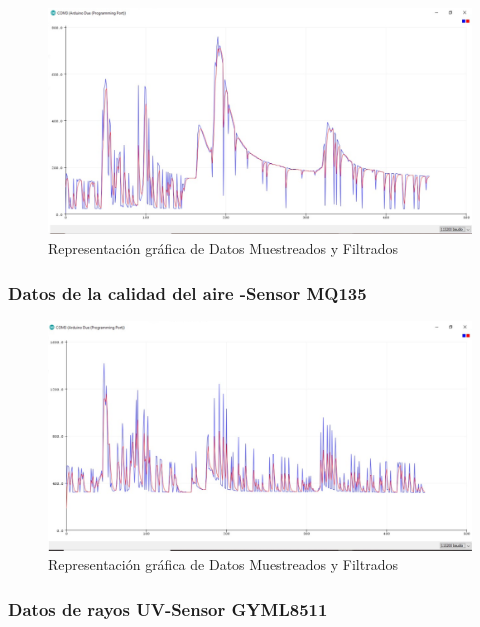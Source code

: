 \documentclass[10pt,a4paper]{article}
\begin{document}
\begin{multicols}{2}
\begin{itemize}
\begin{figure}[H]
\centering
\includegraphics[scale=0.30]{medmq7.PNG}
\caption{Representación gráfica de Datos Muestreados y Filtrados}
\end{figure}


\subsubsection{Datos de la calidad del aire -Sensor MQ135}

\begin{figure}[H]
\centering
\includegraphics[scale=0.30]{medmq135.PNG}
\caption{Representación gráfica de Datos Muestreados y Filtrados}
\end{figure}

\subsubsection{Datos de rayos UV-Sensor GYML8511}


\end{itemize}
\end{multicols}
\end{document}
